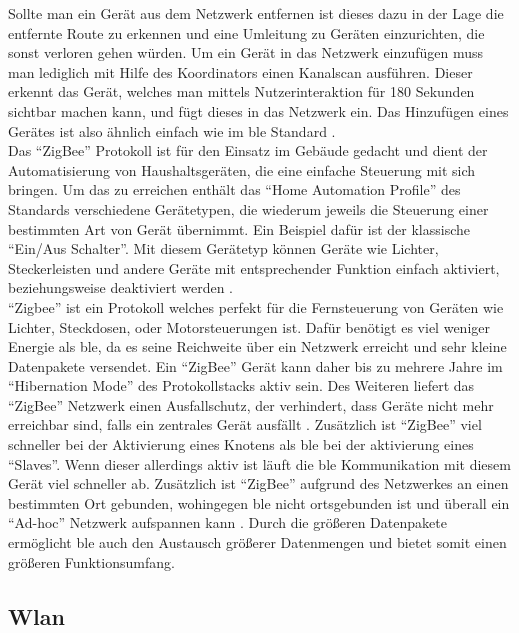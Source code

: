 \noindent Sollte man ein Gerät aus dem Netzwerk entfernen ist dieses dazu in der Lage die entfernte Route zu erkennen und eine Umleitung zu Geräten einzurichten, die sonst verloren gehen würden. Um ein Gerät in das Netzwerk einzufügen muss man lediglich mit Hilfe des Koordinators einen Kanalscan ausführen. Dieser erkennt das Gerät, welches man mittels Nutzerinteraktion für 180 Sekunden sichtbar machen kann, und fügt dieses in das Netzwerk ein. Das Hinzufügen eines Gerätes ist also ähnlich einfach wie im \ac{ble} Standard \cite{ZA:Zig}.\\

\noindent Das "`ZigBee"' Protokoll ist für den Einsatz im Gebäude gedacht und dient der Automatisierung von Haushaltsgeräten, die eine einfache Steuerung mit sich bringen. Um das zu erreichen enthält das "`Home Automation Profile"' des Standards verschiedene Gerätetypen, die wiederum jeweils die Steuerung einer bestimmten Art von Gerät übernimmt. Ein Beispiel dafür ist der klassische "`Ein/Aus Schalter"'. Mit diesem Gerätetyp können Geräte wie Lichter, Steckerleisten und andere Geräte mit entsprechender Funktion einfach aktiviert, beziehungsweise deaktiviert werden \cite[Seite 231]{Gessler14:WNN}.\\

\noindent "`Zigbee"' ist ein Protokoll welches perfekt für die Fernsteuerung von Geräten wie Lichter, Steckdosen, oder Motorsteuerungen ist. Dafür benötigt es viel weniger Energie als \ac{ble}, da es seine Reichweite über ein Netzwerk erreicht und sehr kleine Datenpakete versendet. Ein "`ZigBee"' Gerät kann daher bis zu mehrere Jahre im "`Hibernation Mode"' des Protokollstacks aktiv sein. Des Weiteren liefert das "`ZigBee"' Netzwerk einen Ausfallschutz, der verhindert, dass Geräte nicht mehr erreichbar sind, falls ein zentrales Gerät ausfällt \cite[Seite 267]{Gessler14:WNN}. Zusätzlich ist "`ZigBee"' viel schneller bei der Aktivierung eines Knotens als \ac{ble} bei der aktivierung eines "`Slaves"'. Wenn dieser allerdings aktiv ist läuft die \ac{ble} Kommunikation mit diesem Gerät viel schneller ab. Zusätzlich ist "`ZigBee"' aufgrund des Netzwerkes an einen bestimmten Ort gebunden, wohingegen \ac{ble} nicht ortsgebunden ist und überall ein "`Ad-hoc"' Netzwerk aufspannen kann \cite[Seite 270]{Gessler14:WNN}. Durch die größeren Datenpakete ermöglicht \ac{ble} auch den Austausch größerer Datenmengen und bietet somit einen größeren Funktionsumfang.\\

\subsection{Wlan}
\label{ss:vergleich:wifi}

